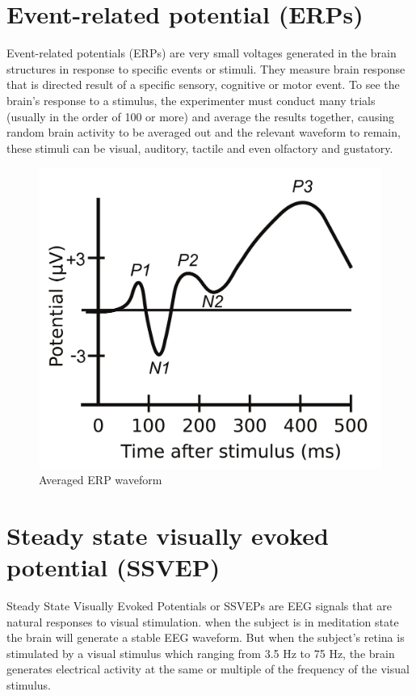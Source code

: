 \section{Event-related potential (ERPs)}

\hspace{1.5cm} Event-related potentials (ERPs) are very small voltages generated in the brain structures in response to specific events or stimuli. They measure brain response that is directed result of a specific sensory, cognitive or motor event. To see the brain's response to a stimulus, the experimenter must conduct many trials (usually in the order of 100 or more) and average the results together, causing random brain activity to be averaged out and the relevant waveform to remain, these stimuli can be visual, auditory, tactile and even olfactory and gustatory.


\begin{figure}[ht]
	\centering
	\includegraphics[scale = 0.3]{chapter3/32.pdf}
	\caption{Averaged ERP waveform}
\end{figure}

\newpage
\section{Steady state visually evoked potential (SSVEP)}

\hspace{1.5cm}  Steady State Visually Evoked Potentials or SSVEPs are EEG signals that are natural responses to visual stimulation. when the subject is in meditation state the brain will generate a stable EEG waveform. But when the subject's retina is stimulated by a visual stimulus which ranging from 3.5 Hz to 75 Hz, the brain generates electrical activity at the same or multiple of the frequency of the visual stimulus.\par


